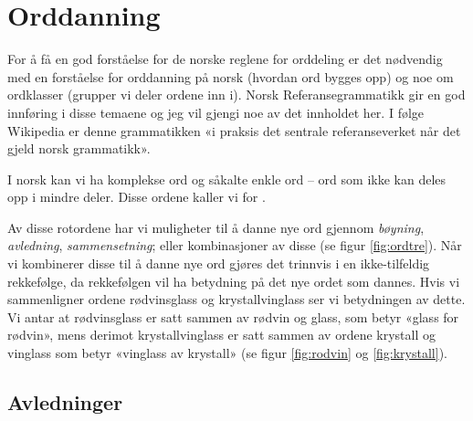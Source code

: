 \chapter{Orddanning}
\label{sec:orddanning}

For å få en god forståelse for de norske reglene for orddeling er det nødvendig med en forståelse for orddanning på norsk (hvordan ord bygges opp) og noe om ordklasser (grupper vi deler ordene inn i). Norsk Referansegrammatikk \cite{faarlund1997norsk} gir en god innføring i disse temaene og jeg vil gjengi noe av det innholdet her. I følge Wikipedia \cite{wiki-nrg} er denne grammatikken «i praksis det sentrale referanseverket når det gjeld norsk grammatikk».

I norsk kan vi ha komplekse ord og såkalte enkle ord -- ord som ikke kan deles opp i mindre deler. Disse ordene kaller vi for . 


Av disse rotordene har vi muligheter til å danne nye ord gjennom \textit{bøyning}, \textit{avledning}, \textit{sammensetning}; eller kombinasjoner av disse (se figur \ref{fig:ordtre}). 
Når vi kombinerer disse til å danne nye ord gjøres det trinnvis i en ikke-tilfeldig rekkefølge, da rekkefølgen vil ha betydning på det nye ordet som dannes. Hvis vi sammenligner ordene rødvinsglass og krystallvinglass ser vi betydningen av dette. Vi antar at rødvinsglass er satt sammen av rødvin og glass, som betyr «glass for rødvin», mens derimot krystallvinglass er satt sammen av ordene krystall og vinglass som betyr «vinglass av krystall» (se figur \ref{fig:rodvin} og \ref{fig:krystall}).



\clearpage
\section{Avledninger}

